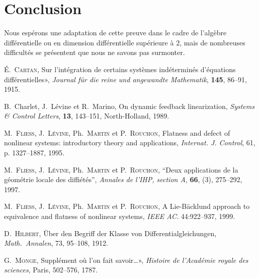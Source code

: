 \documentclass[A4paper, 12pt]{article}
\def\textem#1{{\em #1\/}}
\begin{document}
\section*{Conclusion}

\noindent
Nous espérons une adaptation de cette preuve dans le cadre de l'algèbre
différentielle ou en dimension différentielle supérieure à $2$, mais
de nombreuses difficultés se présentent que nous ne savons pas surmonter.




\begin{thebibliography}{00}

 É.~\textsc{Cartan}, \og Sur l'intégration
  de certains systèmes indéterminés d'équations différentielles»,
  \textit{Journal für die reine und angewandte Mathematik}, {\bf 145}, 86--91,
  1915. 

 B.~Charlet, J.~Lévine et R.~Marino, {\og}On
  dynamic feedback linearization{\fg}, 
  \textit{Systems \& Control Letters},  {\bf 13}, 143--151,
  North-Holland, 1989. 

 M.~\textsc{Fliess}, J.~\textsc{Lévine},
Ph.~\textsc{Martin} et P.~\textsc{Rouchon}, \og Flatness
and defect of nonlinear systems: introductory theory and
applications\fg, \textit{Internat. J. Control}, 61, p. 1327--1887,
1995. 

 M.~\textsc{Fliess}, J.~\textsc{Lévine},
Ph.~\textsc{Martin} et P.~\textsc{Rouchon}, ``Deux applications de la
géométrie locale des diffiétés'', \textit{Annales de l'IHP, section
  A}, \textbf{66}, (3), 275--292, 1997.

 M.~\textsc{Fliess}, J.~\textsc{Lévine},
Ph.~\textsc{Martin} et P.~\textsc{Rouchon}, \og A
Lie-Bäcklund approach to equivalence and flatness of nonlinear
systems\fg, \textit{IEEE AC.} 44:922--937, 1999.

 D.~\textsc{Hilbert}, \og Über den
  Begriff der Klasse von Differentialgleichungen\fg, {\it
  Math.~Annalen}, 73, 95--108, 1912.


 G.~\textsc{Monge}, \og Supplément où l'on
  fait savoir\dots», {\it
  Histoire de l'Académie royale des sciences}, Paris, 502--576, 1787.


\end{thebibliography}
\end{document}
